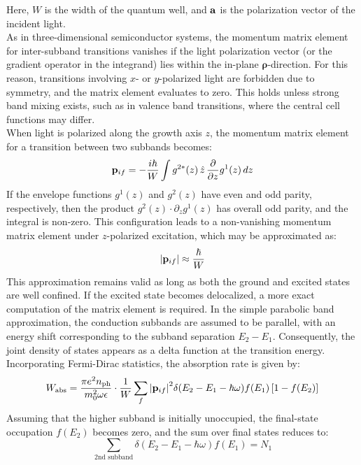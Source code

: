 Here, \( W \) is the width of the quantum well, and \( \vb{a} \) is the polarization vector of the incident light.\\
As in three-dimensional semiconductor systems, the momentum matrix element for inter-subband transitions vanishes if the light polarization vector (or the gradient operator in the integrand) lies within the in-plane \( \boldsymbol{\rho} \)-direction. For this reason, transitions involving \( x \)- or \( y \)-polarized light are forbidden due to symmetry, and the matrix element evaluates to zero. This holds unless strong band mixing exists, such as in valence band transitions, where the central cell functions may differ.\\
When light is polarized along the growth axis \( z \), the momentum matrix element for a transition between two subbands becomes:
\begin{equation}
	\vb{p}_{if} = -\frac{i\hbar}{W} \int g^{2*}(z) \, \hat{z} \, \frac{\partial}{\partial z} g^1(z) \, dz
\end{equation}
If the envelope functions \( g^1(z) \) and \( g^2(z) \) have even and odd parity, respectively, then the product \( g^2(z) \cdot \partial_z g^1(z) \) has overall odd parity, and the integral is non-zero. This configuration leads to a non-vanishing momentum matrix element under \( z \)-polarized excitation, which may be approximated as:
\begin{equation}
	\abs{\vb{p}_{if}} \approx \frac{\hbar}{W}
\end{equation}
This approximation remains valid as long as both the ground and excited states are well confined. If the excited state becomes delocalized, a more exact computation of the matrix element is required.
In the simple parabolic band approximation, the conduction subbands are assumed to be parallel, with an energy shift corresponding to the subband separation \( E_2 - E_1 \). Consequently, the joint density of states appears as a delta function at the transition energy. Incorporating Fermi-Dirac statistics, the absorption rate is given by:
\begin{equation}
	W_{\text{abs}} = \frac{\pi e^2 n_{\text{ph}}}{m_0^2 \omega \epsilon} \cdot \frac{1}{W} \sum_f \abs{\vb{p}_{if}}^2 \delta(E_2 - E_1 - \hbar \omega) f(E_1) \left[1 - f(E_2)\right]
\end{equation}
Assuming that the higher subband is initially unoccupied, the final-state occupation \( f(E_2) \) becomes zero, and the sum over final states reduces to:
\begin{equation}
	\sum_{\text{2nd subband}} \delta(E_2 - E_1 - \hbar \omega) f(E_1) = N_1
\end{equation}
